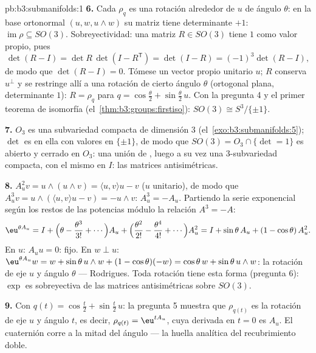 \begin{solution}{pb:b3:submanifolds:1}
\textbf{6.} Cada $\rho_q$ es una rotación alrededor de $u$ de ángulo
$\theta$: en la base ortonormal $(u, w, u\wedge w)$ su matriz tiene
determinante $+1$: $\operatorname{im}\rho \subseteq
SO(3)$. Sobreyectividad: una matriz $R \in SO(3)$ tiene $1$ como valor
propio, pues
\[
\det(R - I) = \det R\,\det(I - R^{\mathsf T}) = \det(I - R)
= (-1)^3\det(R - I),
\]
de modo que $\det(R - I) = 0$. Tómese un vector propio unitario $u$; $R$
conserva $u^\perp$ y se restringe allí a una rotación de cierto ángulo
$\theta$ (ortogonal plana, determinante $1$): $R = \rho_q$ para
$q = \cos\frac\theta2 +
\sin\frac\theta2\,u$. Con la pregunta 4 y el primer teorema de isomorfía
(el~\cref{thm:b3:groups:firstiso}): $SO(3)
\cong S^3/\{\pm1\}$.

\textbf{7.} $O_3$ es una subvariedad
compacta de dimensión $3$
(el~\cref{exo:b3:submanifolds:5}); $\det$ es
 en ella con valores en
$\{\pm1\}$, de modo que $SO(3) = O_3\cap\{\det = 1\}$ es abierto y
cerrado en $O_3$: una unión de
, luego a su vez
una $3$-subvariedad compacta, con el
mismo  en $I$: las
matrices antisimétricas.

\textbf{8.} $A_u^2v = u\wedge(u\wedge v) = \langle u,
v\rangle u - v$ ($u$ unitario), de modo que $A_u^3v = u\wedge(\langle
u,v\rangle u - v) = -u\wedge v$: $A_u^3 = -A_u$. Partiendo la serie
exponencial según los restos de
las potencias módulo la relación
$A^3 = -A$:
\[
\eu^{\theta A_u} = I + \Bigl(\theta - \frac{\theta^3}{3!} +
\cdots\Bigr)A_u + \Bigl(\frac{\theta^2}{2!} -
\frac{\theta^4}{4!} + \cdots\Bigr)A_u^2
= I + \sin\theta\,A_u + (1 - \cos\theta)\,A_u^2 .
\]
En $u$: $A_uu = 0$: fijo. En $w \perp u$: $\eu^{\theta
A_u}w = w + \sin\theta\,u\wedge w + (1 - \cos\theta)(-w) =
\cos\theta\,w + \sin\theta\,u\wedge w$: la rotación de eje $u$ y ángulo
$\theta$ --- Rodrigues. Toda rotación tiene esta forma (pregunta 6):
$\exp$ es sobreyectiva de las matrices antisimétricas sobre $SO(3)$.

\textbf{9.} Con $q(t) = \cos\frac t2 + \sin\frac t2\,u$: la pregunta 5
muestra que $\rho_{q(t)}$ es la rotación de eje $u$ y ángulo $t$, es
decir, $\rho_{q(t)} = \eu^{tA_u}$, cuya derivada en $t = 0$ es $A_u$. El
cuaternión corre a la mitad del ángulo --- la huella analítica del
recubrimiento doble.


\end{solution}
